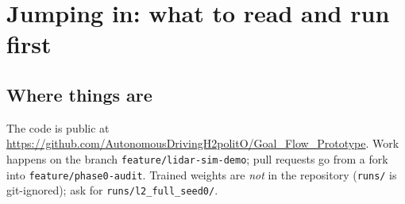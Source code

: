 \documentclass[11pt,a4paper]{article}
\newcommand{\code}[1]{\texttt{#1}}
\begin{document}
\section{Jumping in: what to read and run first}

\subsection{Where things are}
The code is public at \url{https://github.com/AutonomousDrivingH2politO/Goal_Flow_Prototype}. Work happens
on the branch \code{feature/lidar-sim-demo}; pull requests go from a fork into \code{feature/phase0-audit}.
Trained weights are \emph{not} in the repository (\code{runs/} is git-ignored); ask for
\code{runs/l2\_full\_seed0/}.
\end{document}
